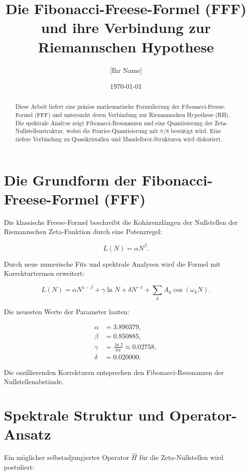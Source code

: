 \documentclass[a4paper,12pt]{article}
\title{Die Fibonacci-Freese-Formel (FFF) und ihre Verbindung zur Riemannschen Hypothese}
\author{[Ihr Name]}
\date{\today}
\begin{document}
\maketitle

\begin{abstract}
Diese Arbeit liefert eine präzise mathematische Formulierung der Fibonacci-Freese-Formel (FFF) 
und untersucht deren Verbindung zur Riemannschen Hypothese (RH). 
Die spektrale Analyse zeigt Fibonacci-Resonanzen und eine Quantisierung der Zeta-Nullstellenstruktur, 
wobei die Fourier-Quantisierung mit $\pi/8$ bestätigt wird. Eine tiefere Verbindung zu Quasikristallen 
und Mandelbrot-Strukturen wird diskutiert.
\end{abstract}

\section{Die Grundform der Fibonacci-Freese-Formel (FFF)}
Die klassische Freese-Formel beschreibt die Kohärenzlängen der Nullstellen der Riemannschen Zeta-Funktion durch eine Potenzregel:

\begin{equation}
L(N) = \alpha N^\beta.
\end{equation}

Durch neue numerische Fits und spektrale Analysen wird die Formel mit Korrekturtermen erweitert:

\begin{equation}
L(N) = \alpha N^{1-\beta} + \gamma \ln N + \delta N^{-1} + \sum_{k} A_k \cos(\omega_k N).
\end{equation}

Die neuesten Werte der Parameter lauten:

\begin{align}
\alpha &= 3.890379, \\
\beta &= 0.850885, \\
\gamma &= \frac{\ln 2}{8\pi} \approx 0.02758, \\
\delta &= 0.020000.
\end{align}

Die oszillierenden Korrekturen entsprechen den Fibonacci-Resonanzen der Nullstellenabstände.

\section{Spektrale Struktur und Operator-Ansatz}
Ein möglicher selbstadjungierter Operator $\hat{H}$ für die Zeta-Nullstellen wird postuliert:
\end{document}

